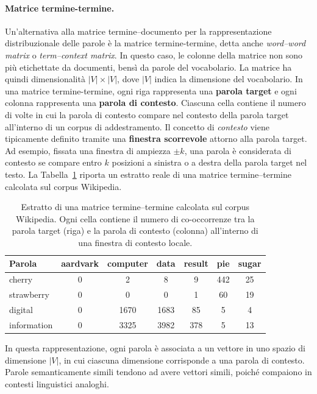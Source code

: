 \paragraph{Matrice termine-termine.}
Un'alternativa alla matrice termine--documento per la rappresentazione distribuzionale delle parole è la matrice termine-termine, detta anche \emph{word--word matrix} o \emph{term--context matrix}. In questo caso, le colonne della matrice non sono più etichettate da documenti, bensì da parole del vocabolario. La matrice ha quindi dimensionalità $|V| \times |V|$, dove $|V|$ indica la dimensione del vocabolario.
In una matrice termine-termine, ogni riga rappresenta una \textbf{parola target} e ogni colonna rappresenta una \textbf{parola di contesto}. Ciascuna cella contiene il numero di volte in cui la parola di contesto compare nel contesto della parola target all'interno di un corpus di addestramento. Il concetto di \emph{contesto} viene tipicamente definito tramite una \textbf{finestra scorrevole} attorno alla parola target. Ad esempio, fissata una finestra di ampiezza $\pm k$, una parola è considerata di contesto se compare entro $k$ posizioni a sinistra o a destra della parola target nel testo.
La Tabella~\ref{tab:term_term_wikipedia} riporta un estratto reale di una matrice termine--termine calcolata sul corpus Wikipedia.
\begin{table}[h!]
\centering
\begin{tabular}{lcccccc}
\hline
\textbf{Parola} & \textbf{aardvark} & \textbf{computer} & \textbf{data} & \textbf{result} & \textbf{pie} & \textbf{sugar} \\
\hline
cherry       & 0 & 2    & 8    & 9    & 442 & 25 \\
strawberry   & 0 & 0    & 0    & 1    & 60  & 19 \\
digital      & 0 & 1670 & 1683 & 85   & 5   & 4  \\
information  & 0 & 3325 & 3982 & 378  & 5   & 13 \\
\hline
\end{tabular}
\caption{Estratto di una matrice termine--termine calcolata sul corpus Wikipedia. Ogni cella contiene il numero di co-occorrenze tra la parola target (riga) e la parola di contesto (colonna) all'interno di una finestra di contesto locale.}
\label{tab:term_term_wikipedia}
\end{table}
In questa rappresentazione, ogni parola è associata a un vettore in uno spazio di dimensione $|V|$, in cui ciascuna dimensione corrisponde a una parola di contesto. Parole semanticamente simili tendono ad avere vettori simili, poiché compaiono in contesti linguistici analoghi.
